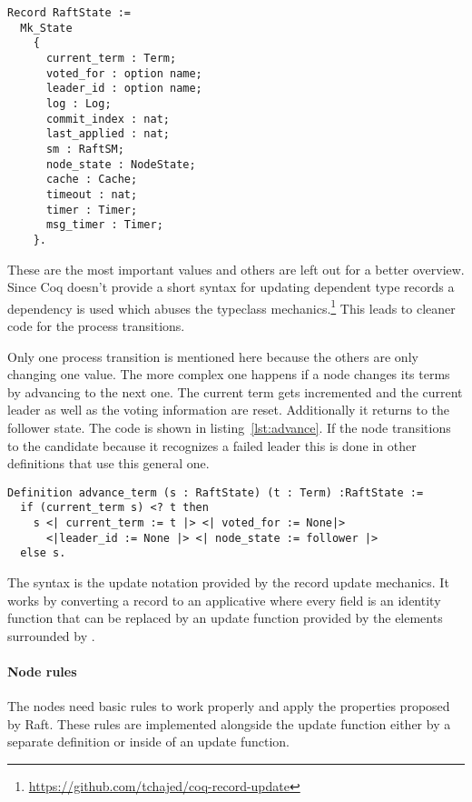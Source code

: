 \begin{lstlisting}[style=coq,label=lst:state,
caption=The dependent record definition of the Raft process state.]
Record RaftState :=
  Mk_State
    {
      current_term : Term;
      voted_for : option name;
      leader_id : option name;
      log : Log;
      commit_index : nat;
      last_applied : nat;
      sm : RaftSM;
      node_state : NodeState;
      cache : Cache;
      timeout : nat;
      timer : Timer;
      msg_timer : Timer;
    }. 
\end{lstlisting}

These are the most important values and others are left out
for a better overview. Since Coq doesn't provide a short
syntax for updating dependent type records a dependency is used
which abuses the typeclass
mechanics.\footnote{\url{https://github.com/tchajed/coq-record-update}}
This leads to cleaner code for the process transitions.

Only one process transition is mentioned here because the others are
only changing one value.
The more complex one happens if a node changes its terms by advancing
to the next one. The current term gets incremented and the current
leader as well as the voting information are reset.
Additionally it returns to the follower state.
The code is shown in listing~\ref{lst:advance}.
If the node transitions to the candidate because it
recognizes a failed leader this is done in other definitions
that use this general one.

\begin{lstlisting}[style=coq,label=lst:advance,
caption=The process transition to advance to the next term.]
Definition advance_term (s : RaftState) (t : Term) :RaftState :=
  if (current_term s) <? t then
    s <| current_term := t |> <| voted_for := None|>
      <|leader_id := None |> <| node_state := follower |>
  else s.
\end{lstlisting}

The  syntax is the update notation provided by the
record update mechanics. It works by converting a record to
an applicative where every field is an identity function that
can be replaced by an update function provided by the elements
surrounded by \code{<| |>}.

\paragraph{Node rules}
The nodes need basic rules to work properly and apply the
properties proposed by Raft. These rules are implemented alongside
the update function either by a separate definition or inside
of an update function.

